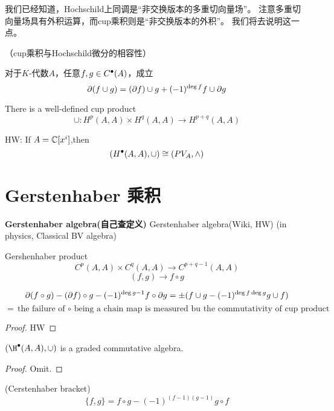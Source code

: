 我们已经知道，Hochschild上同调是“非交换版本的多重切向量场”。
注意多重切向量场具有外积运算，而cup乘积则是“非交换版本的外积”。
我们将去说明这一点。

\begin{prop}（cup乘积与Hochschild微分的相容性）

对于$K$-代数$A$，任意$f,g\in C^{\bullet}(A)$，成立
$$\partial(f\cup g)=(\partial f)\cup g+(-1)^{\deg f}f\cup\partial g$$
\end{prop}


\begin{cor}
There is a well-defined cup product
$$\cup: H^p(A,A)\times H^{q}(A,A)\to H^{p+q}(A,A)$$
\end{cor}

HW: If $A=\mathbb{C}[x^i]$,then
$$(H^{\bullet}(A,A),\cup)\cong (PV_A,\wedge)$$

\section{Gerstenhaber 乘积}
\textbf{Gerstenhaber algebra(自己查定义)}
Gerstenhaber algebra(Wiki, HW)
(in physics, Classical BV algebra)

\begin{definition}Gershenhaber product
$$C^{p}(A,A)\times C^q(A,A)\to C^{p+q-1}(A,A)$$
$$(f,g)\to f\circ g$$

\end{definition}

\begin{prop}
$$\partial(f\circ g)-(\partial f)\circ g-(-1)^{\deg g-1}f\circ\partial g
=\pm(f\cup g-(-1)^{\deg f\deg g}g\cup f)$$
$$=\text{the failure of $\circ$ being a chain map
is measured bu the commutativity of cup product}$$
\end{prop}

\begin{proof}
HW
\end{proof}

\begin{cor}
$(\H\updot(A,A),\cup)$ is a graded commutative algebra.
\end{cor}

\begin{proof}
Omit.
\end{proof}


\begin{definition}(Cerstenhaber bracket)
$$\{f,g\}=f\circ g-(-1)^{(f-1)(g-1)}g\circ f$$
\end{definition}

